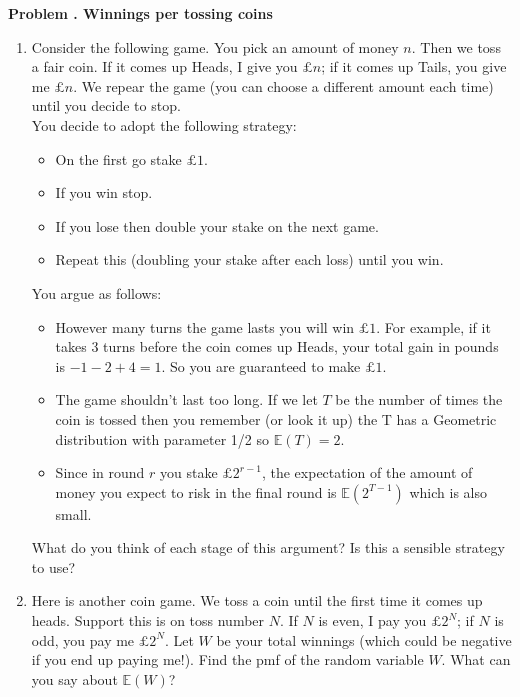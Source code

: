 \documentclass[11pt]{article}
\newcounter{problem}
\newenvironment{problem}[1][]{%
  \refstepcounter{problem}%
  \bigskip\noindent\textbf{Problem \theproblem. #1}\par\smallskip
}{\bigskip}
\begin{document}
\begin{problem}[Winnings per tossing coins]
\begin{enumerate}
      \item Consider the following game. You pick an amount of money $n$. Then we toss 
            a fair coin. If it comes up Heads, I give you $\pounds n$; if it comes up 
            Tails, you give me $\pounds n$. We repear the game (you can choose a different 
            amount each time) until you decide to stop. \\
            You decide to adopt the following strategy:
            \begin{itemize}
                  \item On the first go stake $\pounds 1$.
                  \item If you win stop.
                  \item If you lose then double your stake on the next game.
                  \item Repeat this (doubling your stake after each loss) until you win.
            \end{itemize}
            You argue as follows:
            \begin{itemize}
                  \item However many turns the game lasts you will win $\pounds 1$. For 
                        example, if it takes 3 turns before the coin comes up Heads, your 
                        total gain in pounds is $-1-2+4=1$. So you are guaranteed to make $\pounds 1$.
                  \item The game shouldn't last too long. If we let $T$ be the number of 
                        times the coin is tossed then you remember (or look it up) the T 
                        has a Geometric distribution with parameter 1/2 so $\mathbb{E}(T)=2$.
                  \item Since in round $r$ you stake $\pounds 2^{r-1}$, the expectation of 
                        the amount of money you expect to risk in the final round is 
                        $\mathbb{E}(2^{T-1})$ which is also small.
            \end{itemize}
            What do you think of each stage of this argument? Is this a sensible strategy 
            to use?
      \item Here is another coin game. We toss a coin until the first time it comes up heads. 
            Support this is on toss number $N$. If $N$ is even, I pay you $\pounds 2^N$; if $N$ 
            is odd, you pay me $\pounds 2^N$. Let $W$ be your total winnings (which could be negative 
            if you end up paying me!). Find the pmf of the random variable $W$. What can you say 
            about $\mathbb{E}(W)$?
\end{enumerate}
\end{problem}
\end{document}
